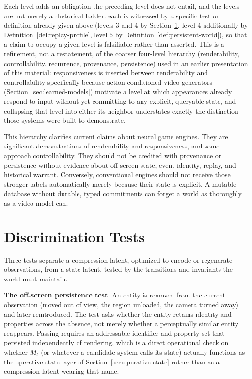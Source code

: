 \documentclass[11pt]{article}
\begin{document}
Each level adds an obligation the preceding level does not entail, and the levels are not merely a rhetorical ladder: each is witnessed by a specific test or definition already given above (levels 3 and 4 by Section~\ref{sec:tests}, level 4 additionally by Definition~\ref{def:replay-profile}, level 6 by Definition~\ref{def:persistent-world}), so that a claim to occupy a given level is falsifiable rather than asserted. This is a refinement, not a restatement, of the coarser four-level hierarchy (renderability, controllability, recurrence, provenance, persistence) used in an earlier presentation of this material: responsiveness is inserted between renderability and controllability specifically because action-conditioned video generators (Section~\ref{sec:learned-models}) motivate a level at which appearances already respond to input without yet committing to any explicit, queryable state, and collapsing that level into either its neighbor understates exactly the distinction those systems were built to demonstrate.

This hierarchy clarifies current claims about neural game engines. They are significant demonstrations of renderability and responsiveness, and some approach controllability. They should not be credited with provenance or persistence without evidence about off-screen state, event identity, replay, and historical warrant. Conversely, conventional engines should not receive those stronger labels automatically merely because their state is explicit. A mutable database without durable, typed commitments can forget a world as thoroughly as a video model can.

\section{Discrimination Tests}
\label{sec:tests}

Three tests separate a compression latent, optimized to encode or regenerate observations, from a state latent, tested by the transitions and invariants the world must maintain.

\textbf{The off-screen persistence test.} An entity is removed from the current observation (moved out of view, the region unloaded, the camera turned away) and later reintroduced. The test asks whether the entity retains identity and properties across the absence, not merely whether a perceptually similar entity reappears. Passing requires an addressable identifier and property set that persisted independently of rendering, which is a direct operational check on whether $M_t$ (or whatever a candidate system calls its state) actually functions as the operative-state layer of Section~\ref{sec:operative-state} rather than as a compression latent wearing that name.
\end{document}
